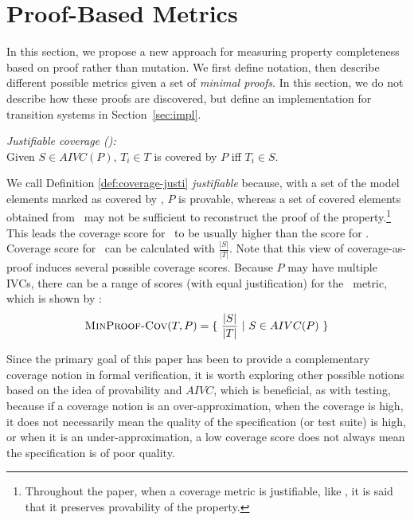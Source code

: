 \newcommand{\minproofcov}{\text{\sc MinProof-Cov}}


\section{Proof-Based Metrics}
\label{sec:method}

In this section, we propose a new approach for measuring property completeness based on proof rather than mutation.  We first define notation, then describe different possible metrics given a set of {\em minimal proofs}.  In this section, we do not describe how these proofs are discovered, but define an implementation for transition systems in Section~\ref{sec:impl}.

\begin{definition} {\emph{Justifiable coverage (\ivccov):}} \\
  \label{def:coverage-justi}
Given $S \in AIVC(P)$, $T_i \in T$ is covered by $P$ iff  $T_i \in S$.
\end{definition}
\vspace{2mm}

%
We call Definition \ref{def:coverage-justi} \emph{justifiable} because, with a set of the model elements marked as covered by \ivccov, $P$ is provable, whereas a set of covered elements obtained from \nondetcov\ may not be sufficient to reconstruct the proof of the property.\footnote{Throughout the paper, when a coverage metric is justifiable, like \ivccov, it is said that it preserves provability of the property.}
This leads the coverage score for \ivccov\ to be usually higher than the score for \nondetcov. Coverage score for \ivccov\ can be calculated with $\frac{|S|}{|T|}$. Note that this view of coverage-as-proof induces several possible coverage scores. Because $P$ may have multiple IVCs, there can be a range of scores (with equal justification) for the \ivccov\ metric, which is shown by \minproofcov:
\[
   \minproofcov(T, P) = \{~\frac{ |S|}{|T|}~|~S \in AIVC(P)~\}
\]

Since the primary goal of
 this paper has been to provide a complementary coverage notion in
  formal verification, it is worth exploring other possible notions based on the idea of provability and $AIVC$, which is beneficial, as with testing, because if a coverage notion is an over-approximation, when the coverage
 is high, it does not necessarily mean the quality of
 the specification (or test suite) is high, or when it is an under-approximation, a low coverage score does not always mean the specification is of poor quality.

